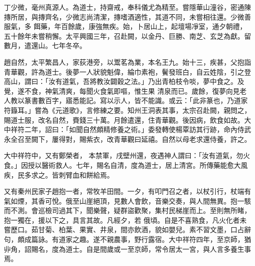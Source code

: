 \begin{pinyinscope}
 丁少微，毫州真源人。為道士，持齋戒，奉科儀尤為精至。嘗隱華山潼谷，密通陳摶所居，與摶齊名，少微志尚清潔，摶嗜酒適性，其道不同，未嘗相往還。少微善服氣，多
 餌藥，年百餘歲，康強無疾。始，卜居山上，起壇場凈室，通夕朝禮，五十餘年未嘗稍懈。太平興國三年，召赴闕，以金丹、巨勝、南芝、玄芝為獻。留數月，遣還山。七年冬卒。



 趙自然，太平繁昌人，家荻港旁，以鬻茗為業，本名王九。始十三，疾甚，父抱詣青華觀，許為道士。後夢一人狀貌魁偉，綸巾素袍，鬢發班白，自云姓陰，引之登高山，謂曰：「汝有道氣，吾將教汝闢穀之法。」乃出青柏枝令啖，夢中食之。及覺，遂不食，神氣清爽，每聞火食氣即嘔，惟生果
 清泉而已。歲餘，復夢向見老人教以篆書數百字，寤悉能記。寫以示人，皆不能識。或云：「此非篆也，乃道家符籙耳。」嘗為《元道歌》，言修練之要。知州王洞表其事，太宗召赴闕，親問之，賜道士服，改名自然，賚錢三十萬。月餘遣還，住青華觀。後因病，飲食如故。大中祥符二年，詔曰：「如聞自然頗精修養之術。」委發轉使楊覃訪其行跡，命內侍武永全召至闕下，屢得對，賜紫衣，改青華觀曰延禧。自然以母老求還侍養，許之。



 大中祥符中，又有鄭榮者，
 本禁軍，戌壁州還，夜遇神人謂曰：「汝有道氣，勿火食。」因授以醫術救人。七年，賜名自清，度為道士，居上清宮。所傳藥能愈大風疾，民多求之。皆刺臂血和餅給焉。



 又有秦州民家子趙抱一者，常牧羊田間。一夕，有叩門召之者，以杖引行，杖端有氣如煙，其香可悅。俄至山崖絕頂，見數人會飲，音樂交奏，與人間無異。抱一駭而不測。會巡檢司過其下，聞樂聲，疑群盜歡聚，集村民梯崖而上。至則無所睹，抱一獨在，援以下之，具言其故。凡經夕，若
 俄頃。自是不喜熟食，凡火化者未嘗歷口。茹甘菊、柏葉、果實、井泉，間亦飲酒，貌如嬰兒。素不習文墨，口占辭句，頗成篇詠。有道家之趣。遂不親農事，野行露宿。大中祥符四年，至京師，猶丱角，詔賜名，度為道士。自是間歲或一至京師，常令居太一宮，與人言多養生事焉。



\end{pinyinscope}